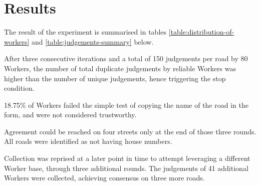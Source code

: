 \section{Results}

The result of the experiment is summarised in tables \ref{table:distribution-of-workers} and \ref{table:judgements-summary} below. 

After three consecutive iterations and a total of 150 judgements per road by 80 Workers, the number of total duplicate judgements by reliable Workers was higher than the number of unique judgements, hence triggering the stop condition. 

18.75\% of Workers failed the simple test of copying the name of the road in the form, and were not considered trustworthy. 

Agreement could be reached on four streets only at the end of those three rounds. All roads were identified as not having house numbers.

Collection was reprised at a later point in time to attempt leveraging a different Worker base, through three additional rounds. The judgements of 41 additional Workers were collected, achieving consensus on three more roads. 

